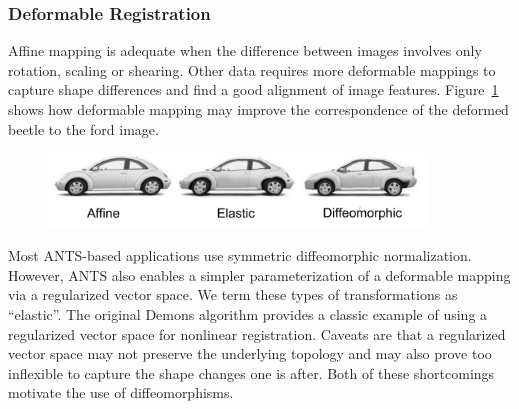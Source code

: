 \documentclass{InsightArticle}
\begin{document}
\subsubsection{Deformable Registration}
Affine mapping is adequate when the
difference between images involves only rotation, scaling or shearing.
Other data requires more deformable mappings to capture shape
differences and find a good alignment of image features.
Figure~\ref{fig:antshier} shows how deformable mapping may improve the
correspondence of the deformed beetle to the ford image.
\begin{figure}
\includegraphics[width=0.9\textwidth]{./Figures/ANTSElastToDiff.pdf} 
\vspace{-0.1in}
\label{fig:antshier}
\end{figure}
Most ANTS-based applications use symmetric diffeomorphic normalization.  However, 
ANTS also enables a simpler parameterization of a deformable mapping via a regularized 
vector space.  We term these types of transformations as ``elastic''.  The original Demons algorithm 
provides a classic example of using a regularized vector space for nonlinear registration.  
Caveats are that a regularized vector space may not preserve the underlying topology 
and may also prove too inflexible to capture the shape changes one is after.  Both of these 
shortcomings motivate the use of diffeomorphisms. 
\end{document}
